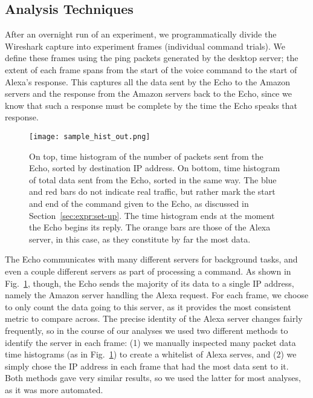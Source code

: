 \subsection{Analysis Techniques}


After an overnight run of an experiment, we programmatically divide the Wireshark capture into experiment frames (individual command trials). We define these frames using the ping packets generated by the desktop server; the extent of each frame spans from the start of the voice command to the start of Alexa's response. This captures all the data sent by the Echo to the Amazon servers and the response from the Amazon servers back to the Echo, since we know that such a response must be complete by the time the Echo speaks that response.

\begin{figure}[]
    \centering
    \texttt{[image: sample\_hist\_out.png]}
    \caption{On top, time histogram of the number of packets sent from the Echo, sorted by destination IP address. On bottom, time histogram of total data sent from the Echo, sorted in the same way. The blue and red bars do not indicate real traffic, but rather mark the start and end of the command given to the Echo, as discussed in Section~\ref{sec:expr:set-up}. The time histogram ends at the moment the Echo begins its reply. The orange bars are those of the Alexa server, in this case, as they constitute by far the most data.}
    \label{fig:example_frame}
\end{figure}

The Echo communicates with many different servers for background tasks, and even a couple different servers as part of processing a command. As shown in Fig.~\ref{fig:example_frame}, though, the Echo sends the majority of its data to a single IP address, namely the Amazon server handling the Alexa request. For each frame, we choose to only count the data going to this server, as it provides the most consistent metric to compare across. The precise identity of the Alexa server changes fairly frequently, so in the course of our analyses we used two different methods to identify the server in each frame: (1) we manually inspected many packet data time histograms (as in Fig.~\ref{fig:example_frame}) to create a whitelist of Alexa serves, and (2) we simply chose the IP address in each frame that had the most data sent to it. Both methods gave very similar results, so we used the latter for most analyses, as it was more automated.

